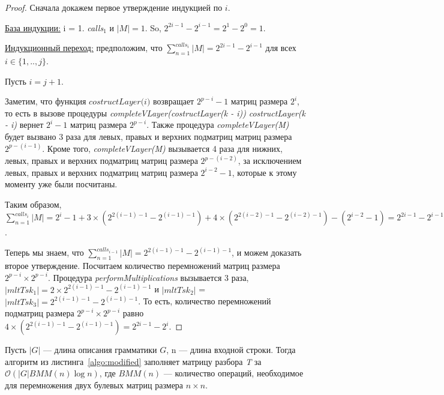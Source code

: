 \begin{proof}

Сначала докажем первое утверждение индукцией по $i$.

\underline{База индукции:} i = 1. \textit{calls$_{1}$} и $|M| = 1$. So, $2^{2i - 1} - 2^{i - 1} = 2^1 - 2^0 = 1$.

\underline{Индукционный переход:} предположим, что $\sum_{n=1}^{calls_i}{|M|} = 2^{2i - 1} - 2^{i - 1}$ для всех $i \in \{ 1, .., j\}$.

Пусть $i = j + 1$.

Заметим, что функция $\textit{costructLayer(i)}$ возвращает $2^{p - i} - 1$ матриц размера $2^i$, то есть в вызове процедуры \textit{completeVLayer(costructLayer(k - i))}  \textit{costructLayer(k - i)} вернет $2^i - 1$ матриц размера $2^{p - i}$.
Также процедура \textit{completeVLayer(M)} будет вызвано 3 раза для левых, правых и верхних подматриц матриц размера $2^{p - (i - 1)}$. Кроме того, \textit{completeVLayer(M)} вызывается 4 раза для нижних, левых, правых и верхних подматриц матриц размера $2^{p - (i - 2)}$, за исключением левых, правых и верхних подматриц матриц размера $2^{i - 2} - 1$, которые к этому моменту уже были посчитаны.

Таким образом, $\sum_{n=1}^{calls_i}{|M|} = 2^{i} - 1 + 3 \times (2^{2(i - 1) - 1} - 2^{(i - 1) - 1}) + 4 \times (2^{2(i - 2) - 1} - 2^{(i - 2) - 1}) - (2^{i - 2} - 1) = 2^{2i - 1} - 2^{i - 1}$.

Теперь мы знаем, что $\sum_{n=1}^{calls_{i-1}}{|M|} = 2^{2(i - 1) - 1} - 2^{(i - 1) - 1}$, и можем доказать второе утверждение. Посчитаем количество перемножений матриц размера $2^{p - i} \times 2^{p - i}$.
Процедура \textit{performMultiplications} вызывается 3 раза, $|mltTsk_1| = 2 \times 2^{2(i - 1) - 1} - 2^{(i - 1) - 1}$ и $|mltTsk_2|$ = $|mltTsk_3| = 2^{2(i - 1) - 1} - 2^{(i - 1) - 1}$. То есть, количество перемножений подматриц размера $2^{p - i} \times 2^{p - i}$ равно $ 4 \times (2^{2(i - 1) - 1} - 2^{(i - 1) - 1}) = 2^{2i - 1} - 2^{i}$.
\end{proof}

\begin{theorem}
Пусть $|G|$ --- длина описания грамматики $G$, n --- длина входной строки. Тогда алгоритм из листинга~\ref{algo:modified} заполняет матрицу разбора \textit{T} за $\mathcal{O}(|G|BMM(n)\log{n})$, где $BMM(n)$ --- количество операций, необходимое для перемножения двух булевых матриц размера $n \times n$.
\end{theorem}

